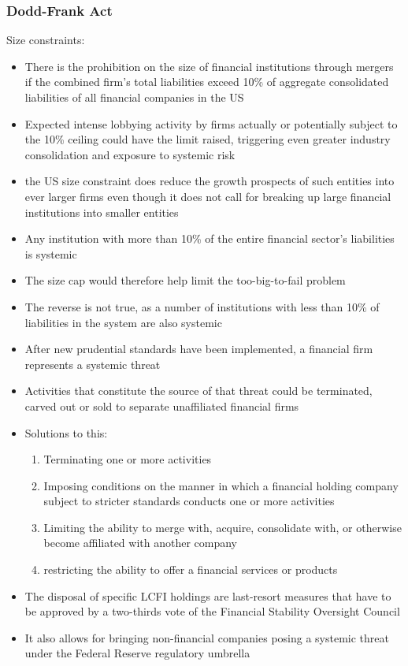 \documentclass[11pt]{beamer}
\begin{document}
\begin{frame}
\frametitle{Dodd-Frank Act}
Size constraints:
\begin{itemize}
\item There is the prohibition on the size of financial institutions through mergers if the combined firm’s total liabilities exceed 10\% of aggregate consolidated liabilities of all financial companies in the US
\item Expected intense lobbying activity by firms actually or potentially subject to the 10\% ceiling could have the limit raised, triggering even greater industry consolidation and exposure to systemic risk
\item the US size constraint does reduce the growth prospects of such entities into ever larger firms even though it does not call for breaking up large financial institutions into smaller entities
\item Any institution with more than 10\% of the entire financial
sector’s liabilities is systemic
\item The size cap would therefore help limit the too-big-to-fail problem
\end{itemize}
\end{frame}

\begin{frame}
\begin{itemize}
\item The reverse is not true, as a number of institutions with less than 10\% of liabilities in the system are also systemic
\item After new prudential standards have been implemented, a financial firm represents a systemic threat
\item Activities that constitute the source of that threat could be terminated, carved out or sold to separate unaffiliated financial firms
\item Solutions to this:
\begin{enumerate}
\item Terminating one or more activities
\item Imposing conditions on the manner in which a financial holding company subject to stricter standards conducts one or more activities
\item Limiting the ability to merge with, acquire, consolidate
with, or otherwise become affiliated with another company
\item restricting the ability to offer a financial services or products
\end{enumerate}
\item The disposal of specific LCFI holdings are last-resort measures that have to be approved by a two-thirds vote of the Financial Stability Oversight Council
\item It also allows for bringing non-financial companies posing a systemic threat under the Federal Reserve regulatory umbrella
\end{itemize}
\end{frame}
\end{document}
